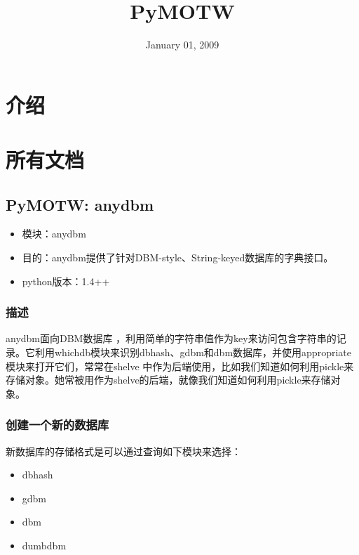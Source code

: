 \documentclass[letterpaper,10pt,english]{manual}
\title{PyMOTW}
\date{January 01, 2009}
\author{}
\begin{document}
\maketitle
\tableofcontents



\resetcurrentobjects


\chapter{介绍}

\resetcurrentobjects


\chapter{所有文档}

\resetcurrentobjects


\section{PyMOTW: anydbm}
\begin{itemize}
\item {} 
模块：anydbm

\item {} 
目的：anydbm提供了针对DBM-style、String-keyed数据库的字典接口。

\item {} 
python版本：1.4++

\end{itemize}


\subsection{描述}

anydbm面向DBM数据库 ，利用简单的字符串值作为key来访问包含字符串的记录。它利用whichdb模块来识别dbhash、gdbm和dbm数据库，并使用appropriate模块来打开它们，常常在shelve 中作为后端使用，比如我们知道如何利用pickle来存储对象。她常被用作为shelve的后端，就像我们知道如何利用pickle来存储对象。


\subsection{创建一个新的数据库}

新数据库的存储格式是可以通过查询如下模块来选择：
\begin{itemize}
\item {} 
dbhash

\item {} 
gdbm

\item {} 
dbm

\item {} 
dumbdbm

\end{itemize}
\end{document}
